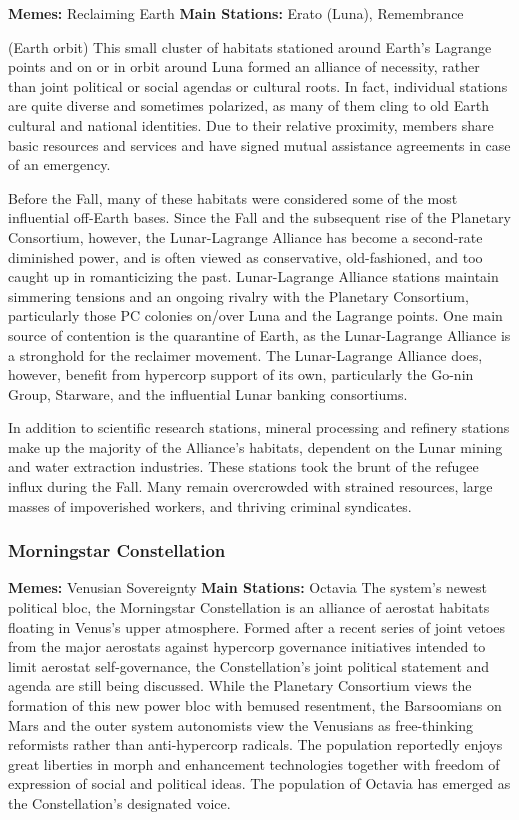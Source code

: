 \textbf{Memes: }Reclaiming Earth
\textbf{Main Stations:} Erato (Luna), Remembrance 

(Earth orbit)
This small cluster of habitats stationed around Earth's 
Lagrange points and on or in orbit around Luna 
formed an alliance of necessity, rather than joint 
political or social agendas or cultural roots. In fact, 
individual stations are quite diverse and sometimes 
polarized, as many of them cling to old Earth cultural 
and national identities. Due to their relative proximity, members share basic resources and services and 
have signed mutual assistance agreements in case of 
an emergency.

Before the Fall, many of these habitats were 
considered some of the most 
influential off-Earth bases. 
Since the Fall and the 
subsequent rise of 
the Planetary Consortium, however, 
the Lunar-Lagrange 
Alliance has become 
a second-rate diminished power, and is 
often viewed as conservative, old-fashioned, and 
too caught up in romanticizing the past. Lunar-Lagrange Alliance stations maintain simmering 
tensions and an ongoing rivalry with the Planetary 
Consortium, particularly those PC colonies on/over 
Luna and the Lagrange points. One main source of 
contention is the quarantine of Earth, as the Lunar-Lagrange Alliance is a stronghold for the reclaimer 
movement. The Lunar-Lagrange Alliance does, 
however, benefit from hypercorp support of its own, 
particularly the Go-nin Group, Starware, and the 
influential Lunar banking consortiums.

In addition to scientific research stations, mineral 
processing and refinery stations make up the majority of the Alliance's habitats, dependent on the Lunar 
mining and water extraction industries. These stations 
took the brunt of the refugee influx during the Fall. 
Many remain overcrowded with strained resources, 
large masses of impoverished workers, and thriving 
criminal syndicates.

\subsubsection{Morningstar Constellation}

\textbf{Memes:} Venusian Sovereignty
\textbf{Main Stations:} Octavia
The system's newest political bloc, the Morningstar 
Constellation is an alliance of aerostat 
habitats floating in Venus's upper atmosphere. Formed after a recent 
series of joint vetoes from the 
major aerostats against hypercorp governance initiatives 
intended to limit aerostat 
self-governance, the Constellation's joint political 
statement and agenda are still 
being discussed. While the 
Planetary Consortium views 
the formation of this new power bloc with bemused 
resentment, the Barsoomians on Mars and the outer 
system autonomists view the Venusians as free-thinking reformists rather than anti-hypercorp radicals. The 
population reportedly enjoys great liberties in morph 
and enhancement technologies together with freedom 
of expression of social and political ideas. The population of Octavia has emerged as the Constellation's 
designated voice.

